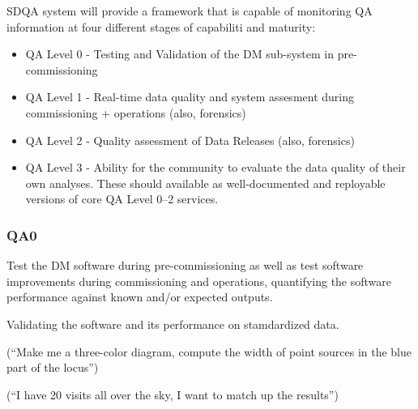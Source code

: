 SDQA system will provide a framework that is capable of monitoring QA
information at four different stages of capabiliti and maturity:

\begin{itemize}
\item QA Level 0 - Testing and Validation of the DM sub-system in pre-commissioning 
\item QA Level 1 - Real-time data quality and system assesment during commissioning + operations (also, forensics)
\item QA Level 2 - Quality assessment of Data Releases (also, forensics) 
\item QA Level 3 - Ability for the community to evaluate the data quality of their own analyses. These should available as well-documented and reployable versions of core QA Level 0--2 services. 
\end{itemize}

\subsubsection{QA0}

Test the DM software during pre-commissioning as well as test software improvements during commissioning and operations, quantifying the software performance against known and/or expected outputs.

Validating the software and its performance on stamdardized data.

(“Make me a three-color diagram, compute the width of point sources in the blue part of the locus”)

(“I have 20 visits all over the sky, I want to match up the results”)

